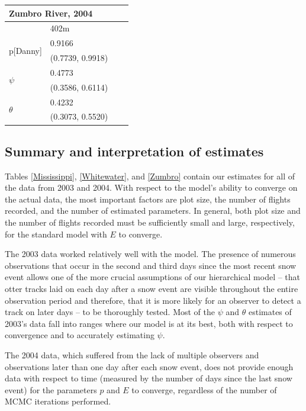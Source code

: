 \documentclass[12pt]{article}
\begin{document}
\begin{table}
    \begin{center}
    \begin{tabular}{|l|l|l|l|}
        \hline
        \multicolumn{2}{|l|}{\textbf{Zumbro River, 2004}} \\
        \hline
            & 402m \\
        \hline
        \multirow{2}{*}{p[Danny]}
            & 0.9166 \\
            & (0.7739, 0.9918) \\
        \hline
        \multirow{2}{*}{\(\psi\)}
            & 0.4773 \\
            & (0.3586, 0.6114) \\
        \hline
        \multirow{2}{*}{\(\theta\)}
            & 0.4232 \\
            & (0.3073, 0.5520) \\
        \hline
    \end{tabular}
    \end{center}
    \end{table}

    \subsection{Summary and interpretation of estimates}
    Tables \ref{Mississippi}, \ref{Whitewater}, and \ref{Zumbro} contain our
    estimates for all of the data from
    2003 and 2004.
    With respect to the model's ability to converge on the actual data, the most
    important factors are plot size, the number of flights recorded, and the
    number of estimated parameters. In general, both plot size and the number of
    flights recorded must be sufficiently small and large, respectively, for the
    standard model with \(E\) to converge.

    The 2003 data worked relatively well with the model. The presence of
    numerous
    observations that occur in the second and third days since the most recent
    snow event allows one of the more crucial assumptions of our hierarchical
    model -- that otter tracks laid on each day after a snow event are visible
    throughout the entire observation period and therefore, that it is more
    likely for an observer to detect a track on later days -- to be thoroughly
    tested. Most of the \(\psi\) and \(\theta\) estimates of 2003's data fall
    into ranges where our model is at its best, both with respect to convergence
    and to accurately estimating \(\psi\).

    The 2004 data, which suffered from the lack of multiple observers and
    observations later than one day after each snow event, does not provide
    enough data with respect to time (measured by the number of days since the
    last snow event) for the parameters \(p\) and \(E\) to converge, regardless
    of the number of MCMC iterations performed.
\end{document}
